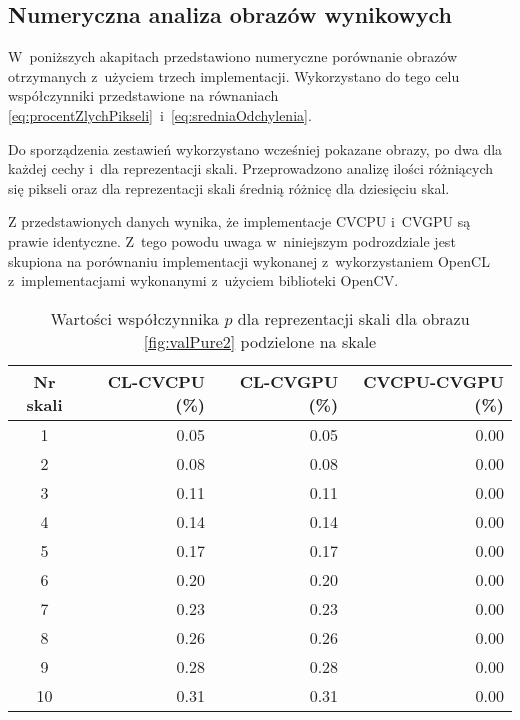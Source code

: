 \subsection{Numeryczna analiza obrazów wynikowych}
\label{subsec:porownanieNumerycznePoprawnosc}

W~poniższych akapitach przedstawiono numeryczne porównanie obrazów otrzymanych z~użyciem trzech implementacji. Wykorzystano do tego celu współczynniki przedstawione na równaniach \eqref{eq:procentZlychPikseli}~i~\eqref{eq:sredniaOdchylenia}.

Do sporządzenia zestawień wykorzystano wcześniej pokazane obrazy, po dwa dla każdej cechy i~dla reprezentacji skali. Przeprowadzono analizę ilości różniących się pikseli oraz dla reprezentacji skali średnią różnicę dla dziesięciu skal. 

Z przedstawionych danych wynika, że implementacje CVCPU i~CVGPU są prawie identyczne. Z~tego powodu uwaga w~niniejszym podrozdziale jest skupiona na porównaniu implementacji wykonanej z~wykorzystaniem OpenCL z~implementacjami wykonanymi z~użyciem biblioteki OpenCV.

\begin{center}
\begin{table}
\centering
\caption{Wartości współczynnika $ p $ dla reprezentacji skali dla obrazu \ref{fig:valPure2} podzielone na skale}
\label{tab:imageScaleRep2}
\begin{tabular}{|c|r|r|r|}
 \hline
Nr skali & CL-CVCPU (\%) & CL-CVGPU (\%) & CVCPU-CVGPU (\%) \\ \hline
1        & 0.05     & 0.05     & 0.00        \\ \hline
2        & 0.08     & 0.08     & 0.00        \\ \hline
3        & 0.11     & 0.11     & 0.00        \\ \hline
4        & 0.14     & 0.14     & 0.00        \\ \hline
5        & 0.17     & 0.17     & 0.00        \\ \hline
6        & 0.20     & 0.20     & 0.00        \\ \hline
7        & 0.23     & 0.23     & 0.00        \\ \hline
8        & 0.26     & 0.26     & 0.00        \\ \hline
9        & 0.28     & 0.28     & 0.00        \\ \hline
10       & 0.31     & 0.31     & 0.00        \\ \hline
\end{tabular}
\end{table}
\end{center}


